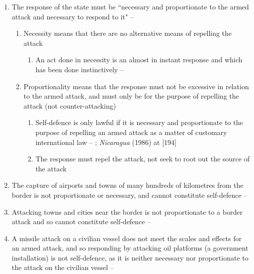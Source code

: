 \begin{enumerate}
\begin{enumerate}
        \item The response of the state must be ``necessary and proportionate to the armed attack and necessary to respond to it" -- 
        \begin{enumerate}
            \item Necessity means that there are no alternative means of repelling the attack
            \begin{enumerate}
                \item An act done in necessity is an almost in instant response and which has been done instinctively -- 
            \end{enumerate}
            \item Proportionality means that the response must not be excessive in relation to the armed attack, and must only be for the purpose of repelling the attack (not counter-attacking)
            \begin{enumerate}
                \item Self-defence is only lawful if it is necessary and proportionate to the purpose of repelling an armed attack as a matter of customary international law -- ; \textit{Nicaragua} (1986) at [194]
                \item The response must repel the attack, not seek to root out the source of the attack
            \end{enumerate}
        \end{enumerate}
        \item The capture of airports and towns of many hundreds of kilometres from the border is not proportionate or necessary, and cannot constitute self-defence -- 
        \item Attacking towns and cities near the border is not proportionate to a border attack and so cannot constitute self-defence -- 
        \item A missile attack on a civilian vessel does not meet the scales and effects for an armed attack, and so responding by attacking oil platforms (a government installation) is not self-defence, as it is neither necessary nor proportionate to the attack on the civilian vessel -- 
    \end{enumerate}

\end{enumerate}
